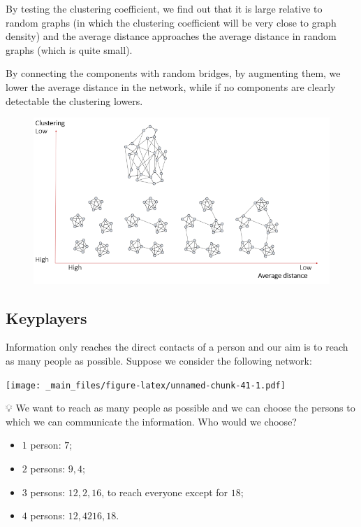 \documentclass[
  notitlepage,
  onecolumn,
  openany]{book}
\providecommand{\tightlist}{%
  \setlength{\itemsep}{0pt}\setlength{\parskip}{0pt}}
\begin{document}
By testing the clustering coefficient, we find out that it is large
relative to random graphs (in which the clustering coefficient will be
very close to graph density) and the average distance approaches the
average distance in random graphs (which is quite small).

By connecting the components with random bridges, by augmenting them, we
lower the average distance in the network, while if no components are
clearly detectable the clustering lowers.

\begin{figure}[h!]

{\centering \includegraphics[width=0.8\linewidth]{images/07-Triads and structural holes/Untitled 4} 

}

\end{figure}

\hypertarget{keyplayers}{%
\subsection{Keyplayers}\label{keyplayers}}

Information only reaches the direct contacts of a person and our aim is to reach as many people as possible. Suppose we consider the following network:

\texttt{[image: \_main\_files/figure-latex/unnamed-chunk-41-1.pdf]}

💡 We want to reach as many people as possible and we can choose the
persons to which we can communicate the information. Who would we
choose?

\begin{itemize}
\tightlist
\item
  \(1\) person: \(7\);
\item
  \(2\) persons: \(9, 4\);
\item
  \(3\) persons: \(12, 2, 16\), to reach everyone except for \(18\);
\item
  \(4\) persons: \(12, 42 16, 18\).
\end{itemize}
\end{document}

